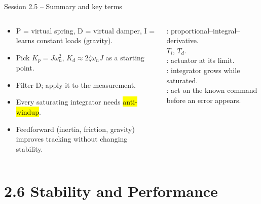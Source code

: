 \documentclass[aspectratio=169,10pt]{beamer}
\begin{document}
\begin{frame}{Session 2.5 -- Summary and key terms}
\begin{columns}[T]
\begin{keybox}
\footnotesize
\begin{itemize}
  \item P = virtual spring, D = virtual damper, I = learns constant loads (gravity).
  \item Pick $K_p=J\omega_n^2$, $K_d\approx2\zeta\omega_nJ$ as a starting point.
  \item Filter D; apply it to the measurement.
  \item Every saturating integrator needs \hl{anti-windup}.
  \item Feedforward (inertia, friction, gravity) improves tracking without changing stability.
\end{itemize}
\end{keybox}
\begin{defbox}
\footnotesize
{}: proportional--integral--derivative.\\
 $T_i$,  $T_d$.\\
: actuator at its limit.\\
: integrator grows while saturated.\\
: act on the known command before an error appears.
\end{defbox}
\end{columns}
\end{frame}

\section{2.6 Stability and Performance}
\end{document}
